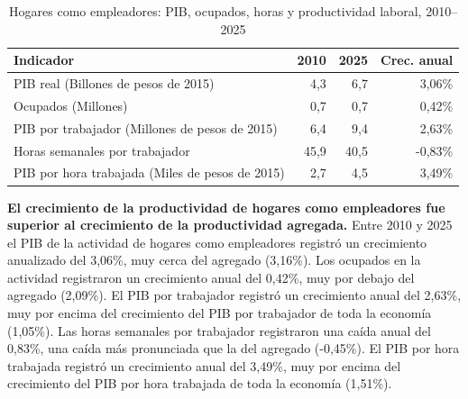 \begin{table}[H]
\centering
\caption{Hogares como empleadores: PIB, ocupados, horas y productividad laboral, 2010--2025}
\label{tab:sector_t_productividad}
\small
\begin{tabular}{lrrr}
\toprule
Indicador & 2010 & 2025 & Crec. anual \\
\midrule
PIB real  (Billones de pesos de 2015) & 4,3 & 6,7 & 3,06\% \\
Ocupados (Millones) & 0,7 & 0,7 & 0,42\% \\
PIB por trabajador (Millones de pesos de 2015) & 6,4 & 9,4 & 2,63\% \\
Horas semanales por trabajador & 45,9 & 40,5 & -0,83\% \\
PIB por hora trabajada (Miles de pesos de 2015) & 2,7 & 4,5 & 3,49\% \\
\bottomrule
\end{tabular}
\end{table}

\textbf{El crecimiento de la productividad de hogares como empleadores fue superior al crecimiento de la productividad agregada.} Entre 2010 y 2025 el PIB de la actividad de hogares como empleadores registró un crecimiento anualizado del 3,06\%, muy cerca del agregado (3,16\%). Los ocupados en la actividad registraron un crecimiento anual del 0,42\%, muy por debajo del agregado (2,09\%). El PIB por trabajador registró un crecimiento anual del 2,63\%, muy por encima del crecimiento del PIB por trabajador de toda la economía (1,05\%). Las horas semanales por trabajador registraron una caída anual del 0,83\%, una caída más pronunciada que la del agregado (-0,45\%). El PIB por hora trabajada registró un crecimiento anual del 3,49\%, muy por encima del crecimiento del PIB por hora trabajada de toda la economía (1,51\%).

